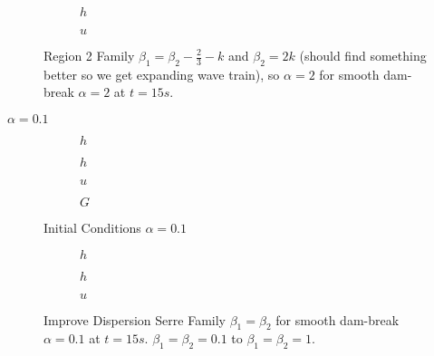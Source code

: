 \documentclass[10pt]{article}
\begin{document}
\begin{figure}
	\centering
	\begin{subfigure}{0.49\textwidth}
		\centering
		
		\caption{$h$}
	\end{subfigure}
	\begin{subfigure}{0.49\textwidth}
		\centering
		
		\caption{$u$}
	\end{subfigure}
	\caption{Region 2 Family $\beta_1 = \beta_2 - \frac{2}{3} - k$ and $\beta_2 = 2k$ (should find something better so we get expanding wave train), so $\alpha = 2$ for smooth dam-break $\alpha = 2$ at $t=15s$.  }
\end{figure}


$\alpha = 0.1$

\begin{figure}
	\centering
	\begin{subfigure}{0.49\textwidth}
		\centering
		
		\caption{$h$}
	\end{subfigure}
	\begin{subfigure}{0.49\textwidth}
		\centering
		
		\caption{$h$}
	\end{subfigure}
	\begin{subfigure}{0.49\textwidth}
		\centering
		
		\caption{$u$}
	\end{subfigure}
	\begin{subfigure}{0.49\textwidth}
		\centering
		
		\caption{$G$}
	\end{subfigure}
	\caption{Initial Conditions $\alpha = 0.1$}
\end{figure}

\begin{figure}
	\centering
	\begin{subfigure}{0.49\textwidth}
		\centering
		
		\caption{$h$}
	\end{subfigure}
	\begin{subfigure}{0.49\textwidth}
		\centering
		
		\caption{$h$}
	\end{subfigure}
	\begin{subfigure}{0.49\textwidth}
		\centering
		
		\caption{$u$}
	\end{subfigure}
	\caption{Improve Dispersion Serre Family $\beta_1 = \beta_2$ for smooth dam-break $\alpha = 0.1$ at $t=15s$. $\beta_1 =\beta_2 = 0.1$ to $\beta_1 =\beta_2 = 1$. }
\end{figure}
\end{document}

